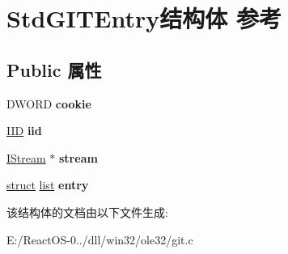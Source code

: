 \hypertarget{struct_std_g_i_t_entry}{}\section{Std\+G\+I\+T\+Entry结构体 参考}
\label{struct_std_g_i_t_entry}
\subsection*{Public 属性}
\begin{DoxyCompactItemize}
\item 
\mbox{\label{struct_std_g_i_t_entry_a499770766fd134dbc7d965682829cf8d}} 
D\+W\+O\+RD {\bfseries cookie}
\item 
\mbox{\label{struct_std_g_i_t_entry_ad969a374ccc6dd04cf420edb6bc38568}} 
\hyperlink{struct___i_i_d}{I\+ID} {\bfseries iid}
\item 
\mbox{\label{struct_std_g_i_t_entry_a74f25587ec53c9c90c6f7f3b280ff100}} 
\hyperlink{interface_i_stream}{I\+Stream} $\ast$ {\bfseries stream}
\item 
\mbox{\label{struct_std_g_i_t_entry_a82c7bf5189123434fe1e7d0b2ee1af0a}} 
\hyperlink{interfacestruct}{struct} \hyperlink{classlist}{list} {\bfseries entry}
\end{DoxyCompactItemize}


该结构体的文档由以下文件生成\+:\begin{DoxyCompactItemize}
\item 
E\+:/\+React\+O\+S-\/0../dll/win32/ole32/git.\+c\end{DoxyCompactItemize}

